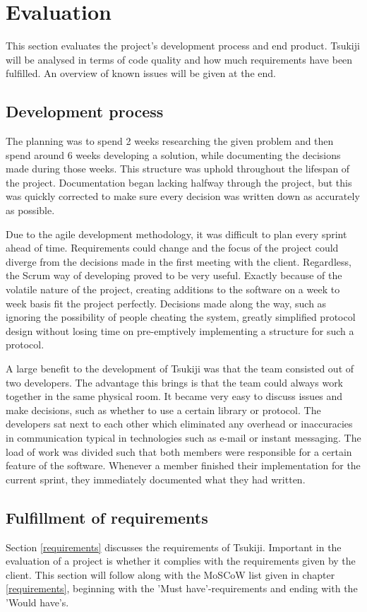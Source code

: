 \section{Evaluation}
\label{evaluation}
This section evaluates the project's development process and end product.
Tsukiji will be analysed in terms of code quality and how much requirements have been fulfilled. An overview of known issues will be given at the end.

\subsection{Development process}
The planning was to spend 2 weeks researching the given problem and then spend around 6 weeks developing a solution, while documenting the decisions made during those weeks.
This structure was uphold throughout the lifespan of the project.
Documentation began lacking halfway through the project, but this was quickly corrected to make sure every decision was written down as accurately as possible.

Due to the agile development methodology, it was difficult to plan every sprint ahead of time.
Requirements could change and the focus of the project could diverge from the decisions made in the first meeting with the client.
Regardless, the Scrum way of developing proved to be very useful.
Exactly because of the volatile nature of the project, creating additions to the software on a week to week basis fit the project perfectly. 
Decisions made along the way, such as ignoring the possibility of people cheating the system, greatly simplified protocol design without losing time on pre-emptively implementing a structure for such a protocol.

A large benefit to the development of Tsukiji was that the team consisted out of two developers.
The advantage this brings is that the team could always work together in the same physical room.
It became very easy to discuss issues and make decisions, such as whether to use a certain library or protocol.
The developers sat next to each other which eliminated any overhead or inaccuracies in communication typical in technologies such as e-mail or instant messaging.
The load of work was divided such that both members were responsible for a certain feature of the software.
Whenever a member finished their implementation for the current sprint, they immediately documented what they had written.

\subsection{Fulfillment of requirements}
\label{requirementsfill}
Section \ref{requirements} discusses the requirements of Tsukiji.
Important in the evaluation of a project is whether it complies with the requirements given by the client.
This section will follow along with the MoSCoW list given in chapter \ref{requirements}, beginning with the 'Must have'-requirements and ending with the 'Would have's.

